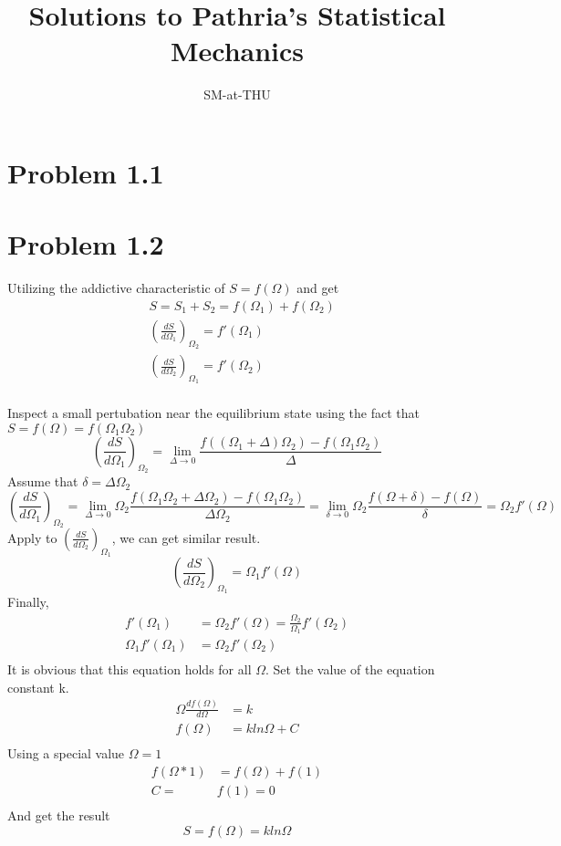\documentclass{article}
\author{SM-at-THU}
\title{\bf{Solutions to Pathria's Statistical Mechanics}}
\begin{document}
\maketitle
\section*{Problem 1.1}

\section*{Problem 1.2}
Utilizing the addictive characteristic of $S=f(\Omega)$ and get
\begin{align}
&S=S_1+S_2=f(\Omega_1)+f(\Omega_2)\\
&(\frac{dS}{d\Omega_1})_{\Omega_2}=f'(\Omega_1)\\
&(\frac{dS}{d\Omega_2})_{\Omega_1}=f'(\Omega_2)\\
\end{align}

Inspect a small pertubation near the equilibrium state using the fact that $S=f(\Omega)=f(\Omega_1\Omega_2)$
\begin{equation}
(\frac{dS}{d\Omega_1})_{\Omega_2}=\lim_{\Delta\rightarrow 0}{\frac{f((\Omega_1+\Delta)\Omega_2)-f(\Omega_1\Omega_2)}{\Delta}}
\end{equation}
Assume that $\delta=\Delta\Omega_2$
\begin{equation}
(\frac{dS}{d\Omega_1})_{\Omega_2}=\lim_{\Delta\rightarrow 0}{\Omega_2\frac{f(\Omega_1\Omega_2+\Delta\Omega_2)-f(\Omega_1\Omega_2)}{\Delta\Omega_2}}=\lim_{\delta\rightarrow 0}{\Omega_2\frac{f(\Omega+\delta)-f(\Omega)}{\delta}}=\Omega_2f'(\Omega)
\end{equation}
Apply to $(\frac{dS}{d\Omega_2})_{\Omega_1}$, we can get similar result.
\begin{equation}
(\frac{dS}{d\Omega_2})_{\Omega_1}=\Omega_1f'(\Omega)
\end{equation}
Finally,
\begin{align}
f'(\Omega_1)&=\Omega_2f'(\Omega)=\frac{\Omega_2}{\Omega_1}f'(\Omega_2)\\
\Omega_1f'(\Omega_1)&=\Omega_2f'(\Omega_2)\\
\end{align}
It is obvious that this equation holds for all $\Omega$. Set the value of the equation constant k. 
\begin{align}
\Omega\frac{df(\Omega)}{d\Omega}&=k\\
f(\Omega)&=kln\Omega+C\\
\end{align}
Using a special value $\Omega=1$
\begin{align}
f(\Omega*1)&=f(\Omega)+f(1)\\
C=&f(1)=0\\
\end{align}
And get the result 
\begin{equation}
S=f(\Omega)=kln\Omega
\end{equation}
\end{document}
